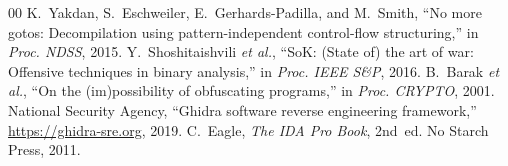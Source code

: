 \documentclass[conference]{IEEEtran}
\begin{document}
\begin{thebibliography}{00}
 K.~Yakdan, S.~Eschweiler, E.~Gerhards-Padilla, and M.~Smith, ``No more gotos: Decompilation using pattern-independent control-flow structuring,'' in \emph{Proc. NDSS}, 2015.
 Y.~Shoshitaishvili \emph{et al.}, ``SoK: (State of) the art of war: Offensive techniques in binary analysis,'' in \emph{Proc. IEEE S\&P}, 2016.
 B.~Barak \emph{et al.}, ``On the (im)possibility of obfuscating programs,'' in \emph{Proc. CRYPTO}, 2001.
 National Security Agency, ``Ghidra software reverse engineering framework,'' \url{https://ghidra-sre.org}, 2019.
 C.~Eagle, \emph{The IDA Pro Book}, 2nd~ed. No Starch Press, 2011.
\end{thebibliography}
\end{document}
